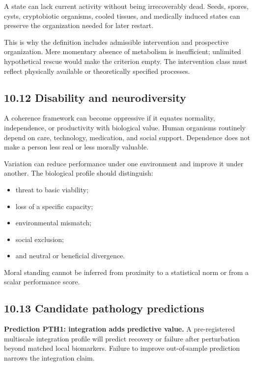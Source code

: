 \documentclass[
  11pt,
]{article}
\providecommand{\tightlist}{%
  \setlength{\itemsep}{0pt}\setlength{\parskip}{0pt}}
\begin{document}
A state can lack current activity without being irrecoverably dead.
Seeds, spores, cysts, cryptobiotic organisms, cooled tissues, and
medically induced states can preserve the organization needed for later
restart.

This is why the definition includes admissible intervention and
prospective organization. Mere momentary absence of metabolism is
insufficient; unlimited hypothetical rescue would make the criterion
empty. The intervention class must reflect physically available or
theoretically specified processes.

\subsection{10.12 Disability and
neurodiversity}\label{disability-and-neurodiversity}

A coherence framework can become oppressive if it equates normality,
independence, or productivity with biological value. Human organisms
routinely depend on care, technology, medication, and social support.
Dependence does not make a person less real or less morally valuable.

Variation can reduce performance under one environment and improve it
under another. The biological profile should distinguish:

\begin{itemize}
\tightlist
\item
  threat to basic viability;
\item
  loss of a specific capacity;
\item
  environmental mismatch;
\item
  social exclusion;
\item
  and neutral or beneficial divergence.
\end{itemize}

Moral standing cannot be inferred from proximity to a statistical norm
or from a scalar performance score.

\subsection{10.13 Candidate pathology
predictions}\label{candidate-pathology-predictions}

\textbf{Prediction PTH1: integration adds predictive value.} A
pre-registered multiscale integration profile will predict recovery or
failure after perturbation beyond matched local biomarkers. Failure to
improve out-of-sample prediction narrows the integration claim.
\end{document}
